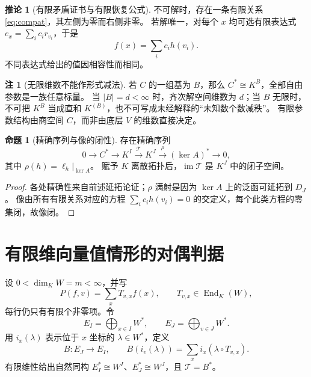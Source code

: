 \documentclass[UTF8,11pt,a4paper]{ctexart}
\theoremstyle{definition}
\newtheorem{proposition}[theorem]{命题}
\newtheorem{corollary}[theorem]{推论}
\newtheorem{remark}[theorem]{注}
\newcommand{\End}{\operatorname{End}}
\newcommand{\im}{\operatorname{im}}
\newcommand{\T}{\mathcal T}
\begin{document}
\begin{corollary}[有限矛盾证书与有限恢复公式]
不可解时，存在一条有限关系\eqref{eq:compat}，其左侧为零而右侧非零。
若解唯一，对每个 $x$ 均可选有限表达式 $e_x=\sum_i c_ir_{v_i}$，于是
\[
 f(x)=\sum_i c_i h(v_i).
\]
不同表达式给出的值因相容性而相同。
\end{corollary}

\begin{remark}[无限维数不能作形式减法]
若 $C$ 的一组基为 $B$，那么 $C^*\cong K^B$，全部自由参数是一族任意标量。
当 $|B|=d<\infty$ 时，齐次解空间维数为 $d$；当 $B$ 无限时，不可把 $K^B$ 当成直和 $K^{(B)}$，也不可写成未经解释的“未知数个数减秩”。
有限参数结构由商空间 $C$，而非由底层 $V$ 的维数直接决定。
\end{remark}

\begin{proposition}[精确序列与像的闭性]
存在精确序列
\[
 0\longrightarrow C^*\longrightarrow K^I
 \xrightarrow{\T}K^J\xrightarrow{\rho}(\ker A)^*
 \longrightarrow0,
\]
其中 $\rho(h)=\ell_h|_{\ker A}$。
赋予 $K$ 离散拓扑后，$\im\T$ 是 $K^J$ 中的闭子空间。
\end{proposition}
\begin{proof}
各处精确性来自前述延拓论证；$\rho$ 满射是因为 $\ker A$ 上的泛函可延拓到 $D_J$。
像由所有有限关系对应的方程 $\sum_i c_ih(v_i)=0$ 的交定义，每个此类方程的零集闭，故像闭。
\end{proof}

\section{有限维向量值情形的对偶判据}\label{sec:vectorfinite}
设 $0<\dim_KW=m<\infty$，并写
\[
 P(f,v)=\sum_x T_{v,x}f(x),\qquad T_{v,x}\in\End_K(W),
\]
每行仍只有有限个非零项。令
\[
 E_I=\bigoplus_{x\in I}W^*,\qquad E_J=\bigoplus_{v\in J}W^*.
\]
用 $i_x(\lambda)$ 表示位于 $x$ 坐标的 $\lambda\in W^*$，定义
\begin{equation}\label{eq:Bdual}
 B:E_J\to E_I,\qquad
 B(i_v(\lambda))=\sum_x i_x(\lambda\circ T_{v,x}).
\end{equation}
有限维性给出自然同构 $E_I^*\cong W^I$、$E_J^*\cong W^J$，且 $\T=B^*$。
\end{document}
